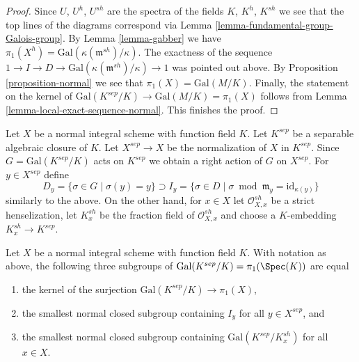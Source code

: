 \begin{proof}
\medskip\noindent
Since $U$, $U^h$, $U^{sh}$ are the spectra of the fields
$K$, $K^h$, $K^{sh}$ we see that the top lines of the diagrams
correspond via
Lemma \ref{lemma-fundamental-group-Galois-group}.
By Lemma \ref{lemma-gabber} we have
$\pi_1(X^h) = \text{Gal}(\kappa(\mathfrak m^{sh})/\kappa)$.
The exactness of the sequence
$1 \to I \to D \to \text{Gal}(\kappa(\mathfrak m^{sh})/\kappa) \to 1$
was pointed out above.
By Proposition \ref{proposition-normal}
we see that $\pi_1(X) = \text{Gal}(M/K)$.
Finally, the statement on the kernel of
$\text{Gal}(K^{sep}/K) \to \text{Gal}(M/K) = \pi_1(X)$
follows from Lemma \ref{lemma-local-exact-sequence-normal}.
This finishes the proof.
\end{proof}

\noindent
Let $X$ be a normal integral scheme with function field $K$.
Let $K^{sep}$ be a separable algebraic closure of $K$.
Let $X^{sep} \to X$ be the normalization of $X$ in $K^{sep}$.
Since $G = \text{Gal}(K^{sep}/K)$ acts on $K^{sep}$
we obtain a right action of $G$ on $X^{sep}$.
For $y \in X^{sep}$ define
$$
D_y = \{\sigma \in G \mid \sigma(y) = y\} \supset
I_y = \{\sigma \in D \mid \sigma \bmod \mathfrak m_y =
\text{id}_{\kappa(y)} \}
$$
similarly to the above. On the other hand, for $x \in X$
let $\mathcal{O}_{X, x}^{sh}$ be a strict henselization,
let $K_x^{sh}$ be the fraction field of $\mathcal{O}_{X, x}^{sh}$
and choose a $K$-embedding $K_x^{sh} \to K^{sep}$.

\begin{lemma}
\label{lemma-normal-pione-quotient-inertia}
Let $X$ be a normal integral scheme with function field $K$.
With notation as above, the following three subgroups of
$\text{Gal}(K^{sep}/K) = \pi_1(\Spec(K))$
are equal
\begin{enumerate}
\item the kernel of the surjection
$\text{Gal}(K^{sep}/K) \longrightarrow \pi_1(X)$,
\item the smallest normal closed subgroup containing $I_y$
for all $y \in X^{sep}$, and
\item the smallest normal closed subgroup containing
$\text{Gal}(K^{sep}/K_x^{sh})$ for all $x \in  X$.
\end{enumerate}
\end{lemma}

